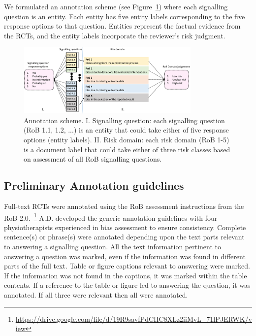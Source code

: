 \documentclass{IOS-Book-Article}
\begin{document}
We formulated an annotation scheme (see Figure~\ref{fig:ann_scheme}) where each signalling question is an entity.
Each entity has five entity labels corresponding to the five response options to that question.
Entities represent the factual evidence from the RCTs, and the entity labels incorporate the reviewer's risk judgment.
%
\begin{figure}[!htbp]
    \centering
    \includegraphics[width=0.80\textwidth]{Figures/annotation_scheme.pdf}
    \caption{Annotation scheme. I. Signalling question: each signalling question (RoB 1.1, 1.2, ...) is an entity that could take either of five response options (entity labels). II. Risk domain: each risk domain (RoB 1-5) is a document label that could take either of three risk classes based on assessment of all RoB signalling questions.}
    \label{fig:ann_scheme}
\end{figure}
%
%
%
\subsection{Preliminary Annotation guidelines}
\label{subsec:annot_guide}
%
Full-text RCTs were annotated using the RoB assessment instructions from the RoB 2.0.~\footnote{\url{https://drive.google.com/file/d/19R9savfPdCHC8XLz2iiMvL_71lPJERWK/view}}
A.D. developed the generic annotation guidelines with four physiotherapists experienced in bias assessment to ensure consistency.
Complete sentence(s) or phrase(s) were annotated depending upon the text parts relevant to answering a signalling question.
All the text information pertinent to answering a question was marked, even if the information was found in different parts of the full text.
Table or figure captions relevant to answering were marked.
If the information was not found in the captions, it was marked within the table contents.
If a reference to the table or figure led to answering the question, it was annotated.
If all three were relevant then all were annotated.
%
\end{document}
